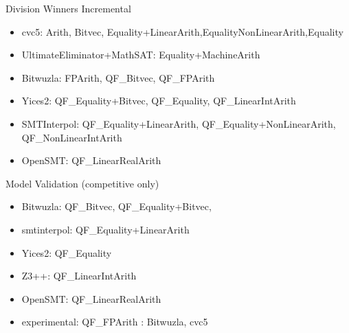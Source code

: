 \documentclass[table]{beamer}
\def\emph#1{\textcolor{MYblue}{#1}}
\begin{document}
\begin{frame}{Division Winners}
  \emph{Incremental}
  \begin{itemize}
\item \emph{cvc5}: Arith, Bitvec, Equality+LinearArith,EqualityNonLinearArith,Equality
\item \emph{UltimateEliminator+MathSAT}: Equality+MachineArith
\item \emph{Bitwuzla}: FPArith, QF\_Bitvec, QF\_FPArith
\item \emph{Yices2}: QF\_Equality+Bitvec, QF\_Equality, QF\_LinearIntArith
\item \emph{SMTInterpol}: QF\_Equality+LinearArith, QF\_Equality+NonLinearArith, QF\_NonLinearIntArith
\item \emph{OpenSMT}: QF\_LinearRealArith
  \end{itemize}
  \medskip

  \pause
  \emph{Model Validation (competitive only)}
  \begin{itemize}
\item \emph{Bitwuzla}: QF\_Bitvec, QF\_Equality+Bitvec,
\item \emph{smtinterpol}: QF\_Equality+LinearArith
\item \emph{Yices2}: QF\_Equality
\item \emph{Z3++}: QF\_LinearIntArith
\item \emph{OpenSMT}: QF\_LinearRealArith

\item experimental: QF\_FPArith : Bitwuzla, cvc5

  \end{itemize}
\end{frame}
\end{document}
